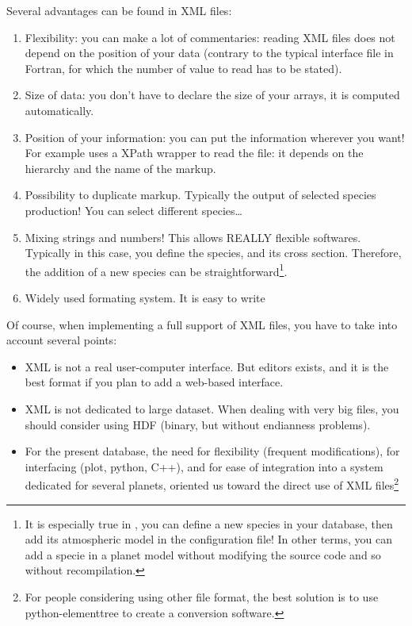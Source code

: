 Several advantages can be found in XML files:
\begin{enumerate}
	\item Flexibility: you can make a lot of commentaries: reading XML files does not depend on the position of your data (contrary  to the typical interface file in Fortran, for which the number of value to read has to be stated).
	\item Size of data: you don't have to declare the size of your arrays, it is computed automatically.
	\item Position of your information: you can put the information wherever you want! For example \Prog uses a XPath wrapper to read the file: it depends on the hierarchy and the name of the markup.
	\item Possibility to duplicate markup. Typically the output of selected species production! You can select different species\ldots
	\item Mixing strings and numbers! This allows  REALLY flexible softwares. Typically in this case, you define the species, and its cross section. Therefore, the addition of a new species can be straightforward\footnote{It is especially true in \Prog, you can define a new species in your database, then add its atmospheric model in the configuration file! In other terms, you can add a specie in a planet model without modifying the source code and so without recompilation.}.
	\item Widely used formating system. It is easy to write
\end{enumerate}

Of course, when implementing a full support of XML files, you have to take into account several points:
\begin{itemize}
	\item XML is not a real user-computer interface. But editors exists, and it is the best format if you plan to add a web-based interface.
	\item XML is not dedicated to large dataset. When dealing with very big files, you should consider using HDF (binary, but without endianness problems).
	\item For the present database, the need for flexibility (frequent modifications), for interfacing  (plot, python, C++), and for ease of integration into a system dedicated for several planets, oriented us toward the direct use of XML files\footnote{For people considering using other file format, the best solution is to use python-elementtree to create a conversion software.}
\end{itemize}

